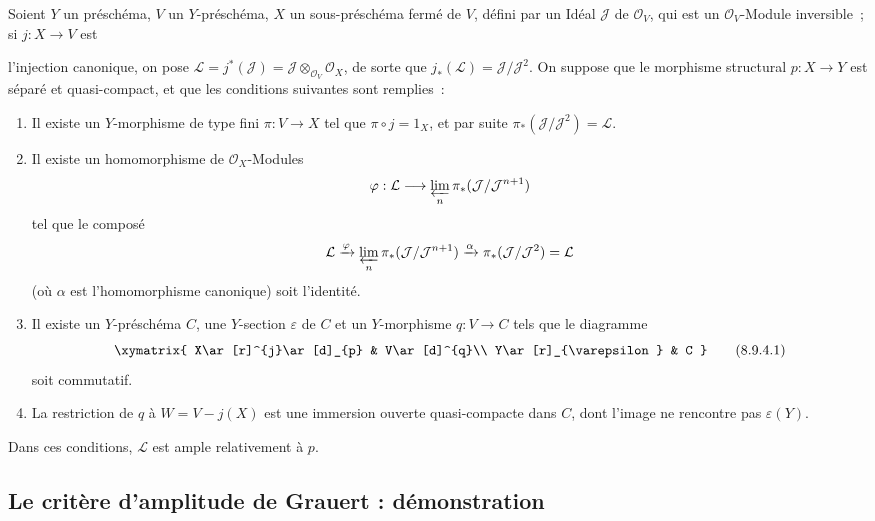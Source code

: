 \begin{proposition}[8.9.4]
\label{II.8.9.4-fr}
Soient $Y$ un préschéma, $V$ un $Y$-préschéma, $X$ un sous-préschéma fermé de
$V$, défini par un Idéal $\mathcal{J}$ de $\mathcal{O}_V$, qui est un
$\mathcal{O}_V$-Module inversible~; si $j:X\to V$ est

l'injection canonique, on pose
$\mathcal{L}=j^*(\mathcal{J})=
\mathcal{J}\otimes_{\mathcal{O}_V}\mathcal{O}_X$, de sorte que
$j_*(\mathcal{L})=\mathcal{J}/\mathcal{J}^2$. On suppose que le morphisme
structural $p:X\to Y$ est séparé et quasi-compact, et que les conditions
suivantes sont remplies~:
\begin{enumerate}
  \item[\rm{(i)}] Il existe un $Y$-morphisme de type fini $\pi:V\to X$ tel
  que $\pi\circ j=1_X$, et par suite
  $\pi_*(\mathcal{J}/\mathcal{J}^2)=\mathcal{L}$.
  \item[\rm{(ii)}] Il existe un homomorphisme de $\mathcal{O}_X$-Modules
  \[
    \varphi:\mathcal{L}\longrightarrow
    \varprojlim_n\pi_*(\mathcal{J}/\mathcal{J}^{n+1})
  \]
  tel que le composé
  \[
    \mathcal{L}\xrightarrow{\varphi}
    \varprojlim_n\pi_*(\mathcal{J}/\mathcal{J}^{n+1})
    \xrightarrow{\alpha}\pi_*(\mathcal{J}/\mathcal{J}^2)=\mathcal{L}
  \]
  (où $\alpha$ est l'homomorphisme canonique) soit l'identité.
  \item[\rm{(iii)}] Il existe un $Y$-préschéma $C$, une $Y$-section
  $\varepsilon$ de $C$ et un $Y$-morphisme $q:V\to C$ tels que le diagramme
  \begin{equation}
  \label{II.8.9.4.1-fr}
    \xymatrix{
      X\ar[r]^{j}\ar[d]_{p} & V\ar[d]^{q}\\
      Y\ar[r]_{\varepsilon} & C
    }
  \tag{8.9.4.1}
  \end{equation}
  soit commutatif.
  \item[\rm{(iv)}] La restriction de $q$ à $W=V-j(X)$ est une immersion
  ouverte quasi-compacte dans $C$, dont l'image ne rencontre pas
  $\varepsilon(Y)$.
\end{enumerate}
Dans ces conditions, $\mathcal{L}$ est ample relativement à $p$.
\end{proposition}

\subsection{Le critère d'amplitude de Grauert : démonstration}
\label{subsection:II.8.10-fr}

